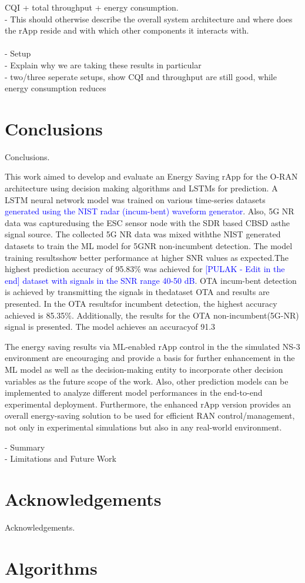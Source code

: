 \documentclass[conference]{IEEEtran}
\begin{document}
CQI + total throughput + energy consumption. \\

- This should otherwise describe the overall system architecture and where does the rApp reside and
with which other components it interacts with.\\
\\
- Setup \\
- Explain why we are taking these results in particular \\
- two/three seperate setups, show CQI and throughput are still good, while energy consumption reduces \\

\section{Conclusions}
Conclusions.

This work aimed to develop and evaluate an Energy Saving rApp for the O-RAN architecture using decision making algorithms and LSTMs for prediction. A LSTM neural network model was trained on various time-series datasets \textcolor{blue}{generated using the NIST radar (incum-bent) waveform generator}. Also, 5G NR data was capturedusing the ESC sensor node with the SDR based CBSD asthe signal source. The collected 5G NR data was mixed withthe NIST generated datasets to train the ML model for 5GNR non-incumbent detection. The model training resultsshow better performance at higher SNR values as expected.The highest prediction accuracy of 95.83\% was achieved for \textcolor{blue}{[PULAK - Edit in the end] dataset with signals in the SNR range 40-50 dB}. OTA incum-bent detection is achieved by transmitting the signals in thedataset OTA and results are presented. In the OTA resultsfor incumbent detection, the highest accuracy achieved is 85.35\%. Additionally, the results for the OTA non-incumbent(5G-NR) signal is presented. The model achieves an accuracyof 91.3%

The energy saving results via ML-enabled rApp control in the the simulated NS-3 environment are encouraging and provide a basis for further enhancement in the ML model as well as the decision-making entity to incorporate other decision variables as the future scope of the work. Also, other prediction models can be implemented to analyze different model performances in the end-to-end experimental deployment. Furthermore, the enhanced rApp version provides an overall energy-saving solution to be used for efficient RAN control/management, not only in experimental simulations but also in any real-world environment.


- Summary \\

- Limitations and Future Work \\

\section{Acknowledgements}
Acknowledgements.

\section{Algorithms}

\vspace{12pt}
\end{document}
